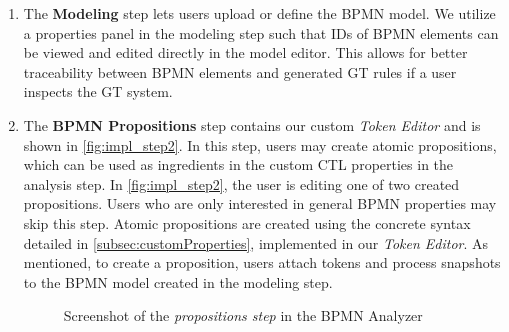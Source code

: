 \documentclass{lmcs} %
\begin{document}
\begin{enumerate}
  \item The \textbf{Modeling} step lets users upload or define the BPMN model.
  We utilize a properties panel in the modeling step such that IDs of BPMN elements can be viewed and edited directly in the model editor.
  This allows for better traceability between BPMN elements and generated GT rules if a user inspects the GT system.
  
  \item The \textbf{BPMN Propositions} step contains our custom \textit{Token Editor} and is shown in \autoref{fig:impl_step2}.
  In this step, users may create atomic propositions, which can be used as ingredients in the custom CTL properties in the analysis step.
  In \autoref{fig:impl_step2}, the user is editing one of two created propositions.
  Users who are only interested in general BPMN properties may skip this step.
  Atomic propositions are created using the concrete syntax detailed in \autoref{subsec:customProperties}, implemented in our \textit{Token Editor}.
  As mentioned, to create a proposition, users attach tokens and process snapshots to the BPMN model created in the modeling step.

\begin{figure}[ht]
    \centering
    \caption{Screenshot of the \textit{propositions step} in the BPMN Analyzer}
    \label{fig:impl_step2}
\end{figure}
  

\end{enumerate}
\end{document}
